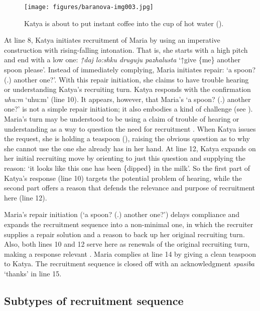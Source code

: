 \documentclass[output=paper,modfonts,nonflat]{langsci/langscibook}
\begin{document}
\begin{figure}
\texttt{[image: figures/baranova-img003.jpg]}
\caption{Katya is about to put instant coffee into the cup of hot water ().}
\label{fig:baranova:3}
\end{figure}

At line 8, Katya initiates recruitment of Maria by using an imperative construction with rising-falling intonation. That is, she starts with a high pitch and end with a low one: \textit{↑daj lo:shku druguju pazhalusta} ‘↑give \{me\} another spoon please’. Instead of immediately complying, Maria initiates repair: ‘a spoon? (.) another one?’. With this repair initiation, she claims to have trouble hearing or understanding Katya's recruiting turn. Katya responds with the confirmation \textit{uhu:m} ‘uhu:m’ (line 10). It appears, however, that Maria’s ‘a spoon? (.) another one?’ is not a simple repair initiation; it also embodies a kind of challenge (see \citealt{Baranova2015}). Maria’s turn may be understood to be using a claim of trouble of hearing or understanding as a way to question the need for recruitment \citep[102--106]{Schegloff2007}. When Katya issues the request, she is holding a teaspoon (), raising the obvious question as to why she cannot use the one she already has in her hand. At line 12, Katya expands on her initial recruiting move by orienting to just this question and supplying the reason: ‘it looks like this one has been \{dipped\} in the milk’. So the first part of Katya's response (line 10) targets the potential problem of hearing, while the second part offers a reason that defends the relevance and purpose of recruitment here (line 12).

Maria’s repair initiation (‘a spoon? (.) another one?’) delays compliance and expands the recruitment sequence into a non-minimal one, in which the recruiter supplies a repair solution and a reason to back up her original recruiting turn. Also, both lines 10 and 12 serve here as renewals of the original recruiting turn, making a response relevant \citep{Davidson1984,Pomerantz1984response}. Maria complies at line 14 by giving a clean teaspoon to Katya. The recruitment sequence is closed off with an acknowledgment \textit{spasiba} ‘thanks’ in line 15.

\subsection{Subtypes of recruitment sequence}\label{sec:baranova:2.3}
\end{document}
